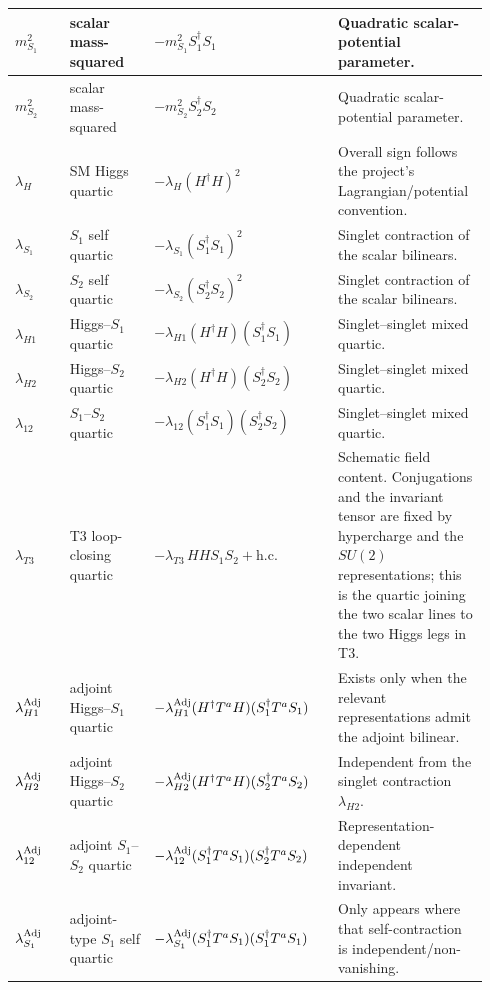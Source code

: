 \documentclass{article}
\begin{document}
\begin{landscape}
\begin{longtable}{@{}p{0.11\linewidth}p{0.17\linewidth}p{0.37\linewidth}p{0.29\linewidth}@{}}
\midrule
$m_{S_1}^2$ & scalar mass-squared & $-m_{S_1}^2 S_1^\dagger S_1$ & Quadratic scalar-potential parameter. \\
\midrule
$m_{S_2}^2$ & scalar mass-squared & $-m_{S_2}^2 S_2^\dagger S_2$ & Quadratic scalar-potential parameter. \\
\midrule
$\lambda_H$ & SM Higgs quartic & $-\lambda_H(H^\dagger H)^2$ & Overall sign follows the project's Lagrangian/potential convention. \\
\midrule
$\lambda_{S_1}$ & $S_1$ self quartic & $-\lambda_{S_1}(S_1^\dagger S_1)^2$ & Singlet contraction of the scalar bilinears. \\
\midrule
$\lambda_{S_2}$ & $S_2$ self quartic & $-\lambda_{S_2}(S_2^\dagger S_2)^2$ & Singlet contraction of the scalar bilinears. \\
\midrule
$\lambda_{H1}$ & Higgs--$S_1$ quartic & $-\lambda_{H1}(H^\dagger H)(S_1^\dagger S_1)$ & Singlet--singlet mixed quartic. \\
\midrule
$\lambda_{H2}$ & Higgs--$S_2$ quartic & $-\lambda_{H2}(H^\dagger H)(S_2^\dagger S_2)$ & Singlet--singlet mixed quartic. \\
\midrule
$\lambda_{12}$ & $S_1$--$S_2$ quartic & $-\lambda_{12}(S_1^\dagger S_1)(S_2^\dagger S_2)$ & Singlet--singlet mixed quartic. \\
\midrule
$\lambda_{T3}$ & T3 loop-closing quartic & $-\lambda_{T3}\,H H S_1 S_2+\mathrm{h.c.}$ & Schematic field content. Conjugations and the invariant tensor are fixed by hypercharge and the $SU(2)$ representations; this is the quartic joining the two scalar lines to the two Higgs legs in T3. \\
\midrule
$\lambda_{H1}^{\rm Adj}$ & adjoint Higgs--$S_1$ quartic & $-\lambda_{H1}^{\rm Adj}(H^\dagger T^a H)(S_1^\dagger T^a S_1)$ & Exists only when the relevant representations admit the adjoint bilinear. \\
\midrule
$\lambda_{H2}^{\rm Adj}$ & adjoint Higgs--$S_2$ quartic & $-\lambda_{H2}^{\rm Adj}(H^\dagger T^a H)(S_2^\dagger T^a S_2)$ & Independent from the singlet contraction $\lambda_{H2}$. \\
\midrule
$\lambda_{12}^{\rm Adj}$ & adjoint $S_1$--$S_2$ quartic & $-\lambda_{12}^{\rm Adj}(S_1^\dagger T^a S_1)(S_2^\dagger T^a S_2)$ & Representation-dependent independent invariant. \\
\midrule
$\lambda_{S_1}^{\rm Adj}$ & adjoint-type $S_1$ self quartic & $-\lambda_{S_1}^{\rm Adj}(S_1^\dagger T^a S_1)(S_1^\dagger T^a S_1)$ & Only appears where that self-contraction is independent/non-vanishing. \\

\end{longtable}
\end{landscape}
\end{document}
